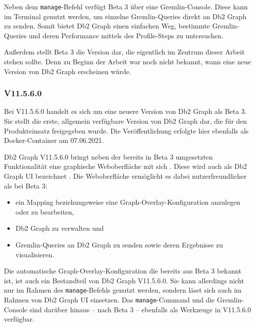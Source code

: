 Neben dem \texttt{manage}-Befehl verfügt Beta 3 über eine Gremlin-Console. Diese kann im Terminal genutzt werden, um einzelne Gremlin-Queries direkt an Db2 Graph zu senden. Somit bietet Db2 Graph einen einfachen Weg, bestimmte Gremlin-Queries und deren Performance mittels des Profile-Steps zu untersuchen.

Außerdem stellt Beta 3 die Version dar, die eigentlich im Zentrum dieser Arbeit stehen sollte. Denn zu Beginn der Arbeit war noch nicht bekannt, wann eine neue Version von Db2 Graph erscheinen würde. 

\subsubsection{V11.5.6.0}

Bei V11.5.6.0 handelt es sich um eine neuere Version von Db2 Graph als Beta 3. Sie stellt die erste, allgemein verfügbare Version von Db2 Graph dar, die für den Produkteinsatz freigegeben wurde. Die Veröffentlichung erfolgte hier ebenfalls als Docker-Container am 07.06.2021. 

Db2 Graph V11.5.6.0 bringt neben der bereits in Beta 3 umgesetzten Funktionalität eine graphische Weboberfläche mit sich \cite{ibm_docs_db2_graph_ui}. Diese wird auch als Db2 Graph UI bezeichnet \cite{ibm_docs_db2_graph_ui}. Die Weboberfläche ermöglicht es dabei nutzerfreundlicher als bei Beta 3: 

\begin{itemize}
    \item ein Mapping beziehungsweise eine Graph-Overlay-Konfiguration anzulegen oder zu bearbeiten,
    \item Db2 Graph zu verwalten und 
    \item Gremlin-Queries an Db2 Graph zu senden sowie deren Ergebnisse zu visualisieren. 
\end{itemize}

Die automatische Graph-Overlay-Konfiguration die bereits aus Beta 3 bekannt ist, ist auch ein Bestandteil von Db2 Graph V11.5.6.0. Sie kann allerdings nicht nur im Rahmen des \texttt{manage}-Befehls genutzt werden, sondern lässt sich auch im Rahmen von Db2 Graph UI einsetzen. Das \texttt{manage}-Command und die Gremlin-Console sind darüber hinaus -- nach Beta 3 -- ebenfalls als Werkzeuge in V11.5.6.0 verfügbar.

